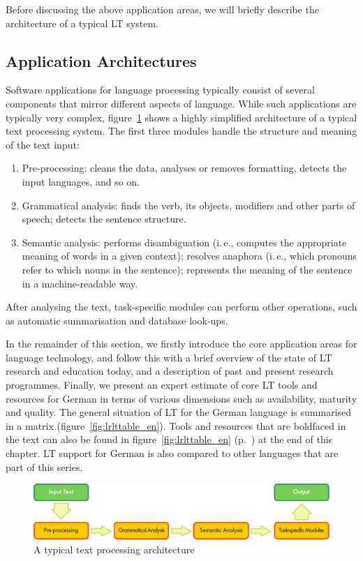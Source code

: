 \documentclass[]{../../metanetpaper}
\begin{document}
\begin{multicols}{2}
Before discussing the above application areas, we will briefly describe the architecture of a typical LT system.

\subsection{Application Architectures}

Software applications for language processing typically consist of several components that mirror different aspects of language. While such applications are typically very complex, figure~\ref{fig:textprocessingarch_en} shows a highly simplified architecture of a typical text processing system. The first three modules handle the structure and meaning of the text input:

\begin{enumerate}
\item Pre-processing: cleans the data, analyses or removes formatting, detects the input languages, and so on.
\item Grammatical analysis: finds the verb, its objects, modifiers and other parts of speech; detects the sentence structure.
\item Semantic analysis: performs disambiguation (i.\,e., computes the appropriate meaning of words in a given context); resolves anaphora (i.\,e., which pronouns refer to which nouns in the sentence); represents the meaning of the sentence in a machine-readable way.
\end{enumerate}

After analysing the text, task-specific modules can perform other operations, such as automatic summarisation and database look-ups.

In the remainder of this section, we firstly introduce the core application areas for language technology, and follow this with a brief overview of the state of LT research and education today, and a description of past and present research programmes. Finally, we present an expert estimate of core LT tools and resources for German in terms of various dimensions such as availability, maturity and quality. The general situation of LT for the German language is summarised in a matrix (figure~\ref{fig:lrlttable_en}). Tools and resources that are boldfaced in the text can also be found in figure~\ref{fig:lrlttable_en} (p.~\pageref{fig:lrlttable_en}) at the end of this chapter. LT support for German is also compared to other languages that are part of this series.

\begin{figure}[htb]
  \center
  \includegraphics[width=\textwidth]{../_media/english/text_processing_app_architecture}
  \caption{A typical text processing architecture}
  \label{fig:textprocessingarch_en}
\end{figure}


\end{multicols}
\end{document}
